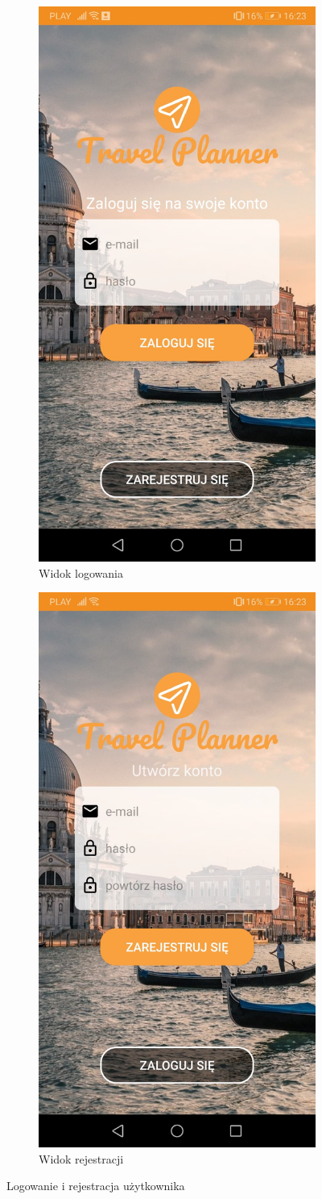 \documentclass[10pt,twoside,a4paper]{report}
\begin{document}
\begin{figure}[h]
\begin{subfigure}{0.5\textwidth}
\centering
\includegraphics[width=0.9\linewidth, width=5cm]{loginView}
\caption{Widok logowania}
\label{fig:loginView}
\end{subfigure}
\begin{subfigure}{0.5\textwidth}
\centering
\includegraphics[width=0.9\linewidth, width=5cm]{registrationPage}
\caption{Widok rejestracji}
\label{fig:registrationPage}
\end{subfigure}
\caption{Logowanie i rejestracja użytkownika}
\label{fig:podrecznik1}
\end{figure}
\FloatBarrier
\end{document}
